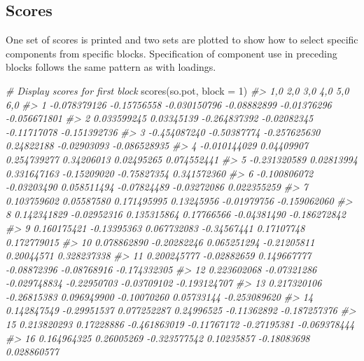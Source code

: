 \documentclass[
]{article}
\newenvironment{Shaded}{\begin{snugshade}}{\end{snugshade}}
\newcommand{\AttributeTok}[1]{\textcolor[rgb]{0.77,0.63,0.00}{#1}}
\newcommand{\CommentTok}[1]{\textcolor[rgb]{0.56,0.35,0.01}{\textit{#1}}}
\newcommand{\DecValTok}[1]{\textcolor[rgb]{0.00,0.00,0.81}{#1}}
\newcommand{\FunctionTok}[1]{\textcolor[rgb]{0.00,0.00,0.00}{#1}}
\newcommand{\NormalTok}[1]{#1}
\begin{document}
\hypertarget{scores}{%
\subsection{Scores}\label{scores}}

One set of scores is printed and two sets are plotted to show how to
select specific components from specific blocks. Specification of
component use in preceding blocks follows the same pattern as with
loadings.

\begin{Shaded}
\begin{Highlighting}[]
\CommentTok{\# Display scores for first block}
\FunctionTok{scores}\NormalTok{(so.pot, }\AttributeTok{block =} \DecValTok{1}\NormalTok{)}
\CommentTok{\#\textgreater{}             1,0         2,0          3,0         4,0         5,0          6,0}
\CommentTok{\#\textgreater{} 1  {-}0.078379126 {-}0.15756558 {-}0.030150796 {-}0.08882899 {-}0.01376296 {-}0.056671801}
\CommentTok{\#\textgreater{} 2   0.033599245  0.03345139 {-}0.264837392 {-}0.02082345 {-}0.11717078 {-}0.151392736}
\CommentTok{\#\textgreater{} 3  {-}0.454087240 {-}0.50387774 {-}0.257625630  0.24822188 {-}0.02903093 {-}0.086528935}
\CommentTok{\#\textgreater{} 4  {-}0.010144029  0.04409907  0.254739277  0.34206013  0.02495265  0.074552441}
\CommentTok{\#\textgreater{} 5  {-}0.231320589  0.02813994  0.331647163 {-}0.15209020 {-}0.75827354  0.341572360}
\CommentTok{\#\textgreater{} 6  {-}0.100806072 {-}0.03203490  0.058511494 {-}0.07824489 {-}0.03272086  0.022355259}
\CommentTok{\#\textgreater{} 7   0.103759602  0.05587580  0.171495995  0.13245956 {-}0.01979756 {-}0.159062060}
\CommentTok{\#\textgreater{} 8   0.142341829 {-}0.02952316  0.135315864  0.17766566 {-}0.04381490 {-}0.186272842}
\CommentTok{\#\textgreater{} 9   0.160175421 {-}0.13395363  0.067732083 {-}0.34567441  0.17107748  0.172779015}
\CommentTok{\#\textgreater{} 10  0.078862890 {-}0.20282246  0.065251294 {-}0.21205811  0.20044571  0.328237338}
\CommentTok{\#\textgreater{} 11  0.200245777 {-}0.02882659  0.149667777 {-}0.08872396 {-}0.08768916 {-}0.174332305}
\CommentTok{\#\textgreater{} 12  0.223602068 {-}0.07321286 {-}0.029748834 {-}0.22950703 {-}0.03709102 {-}0.193124707}
\CommentTok{\#\textgreater{} 13  0.217320106 {-}0.26815383  0.096949900 {-}0.10070260  0.05733144 {-}0.253089620}
\CommentTok{\#\textgreater{} 14  0.142847549 {-}0.29951537  0.077252287  0.24996525 {-}0.11362892 {-}0.187257376}
\CommentTok{\#\textgreater{} 15  0.213820293  0.17228886 {-}0.461863019 {-}0.11767172 {-}0.27195381 {-}0.069378444}
\CommentTok{\#\textgreater{} 16  0.164964325  0.26005269 {-}0.323577542  0.10235857 {-}0.18083698  0.028860577}

\end{Highlighting}
\end{Shaded}
\end{document}
